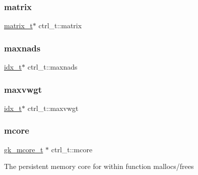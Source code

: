 \mbox{\label{structctrl__t_a4dc8d1b4dd2561504f9c545068c9f5a8}} 
\subsubsection{\texorpdfstring{matrix}{matrix}}
{\footnotesize\ttfamily \hyperlink{structmatrix__t}{matrix\+\_\+t}$\ast$ ctrl\+\_\+t\+::matrix}

\mbox{\label{structctrl__t_ac4f8f5cda17ac6d950c61ba575af566c}} 
\subsubsection{\texorpdfstring{maxnads}{maxnads}}
{\footnotesize\ttfamily \hyperlink{3rd_party_2parmetis-4_80_83_2metis_2include_2metis_8h_aaa5262be3e700770163401acb0150f52}{idx\+\_\+t}$\ast$ ctrl\+\_\+t\+::maxnads}

\mbox{\label{structctrl__t_a02e0b5b3209303d1ec1634de01a10e88}} 
\subsubsection{\texorpdfstring{maxvwgt}{maxvwgt}}
{\footnotesize\ttfamily \hyperlink{3rd_party_2parmetis-4_80_83_2metis_2include_2metis_8h_aaa5262be3e700770163401acb0150f52}{idx\+\_\+t}$\ast$ ctrl\+\_\+t\+::maxvwgt}

\mbox{\label{structctrl__t_aa46cd6966a7472f31f8463b6ca99ec52}} 
\subsubsection{\texorpdfstring{mcore}{mcore}}
{\footnotesize\ttfamily \hyperlink{structgk__mcore__t}{gk\+\_\+mcore\+\_\+t} $\ast$ ctrl\+\_\+t\+::mcore}

The persistent memory core for within function mallocs/frees \mbox{\label{structctrl__t_aeecdd5a52f8624eb1563bea4ba696caf}} 

